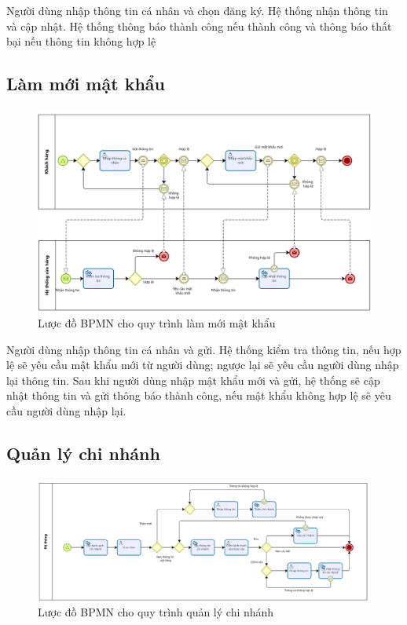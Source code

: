 Người dùng nhập thông tin cá nhân và chọn đăng ký. Hệ thống nhận thông tin và cập nhật. Hệ thống thông báo thành công nếu thành công và thông báo thất bại nếu thông tin không hợp lệ


\subsection{Làm mới mật khẩu}
\begin{figure}[!htp]
	\centering
	\includegraphics[width=14cm]{img/BPMN/Hien/Customer_resetPassword.png}
	\newline
	\caption{Lược đồ BPMN cho quy trình làm mới mật khẩu}
\end{figure}

Người dùng nhập thông tin cá nhân và gửi. Hệ thống kiểm tra thông tin, nếu hợp lệ sẽ yêu cầu mật khẩu mới từ người dùng; ngược lại sẽ yêu cầu người dùng nhập lại thông tin. Sau khi người dùng nhập mật khẩu mới và gửi, hệ thống sẽ cập nhật thông tin và gửi thông báo thành công, nếu mật khẩu không hợp lệ sẽ yêu cầu người dùng nhập lại.
\newpage

\subsection{Quản lý chi nhánh}
\begin{figure}[!htp]
	\centering
	\includegraphics[width=16cm]{img/BPMN/Hien/Branch_management.png}
	\newline
	\caption{Lược đồ BPMN cho quy trình quản lý chi nhánh}
\end{figure}

